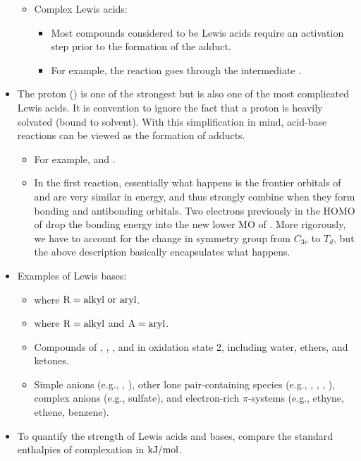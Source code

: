 \documentclass[../notes.tex]{subfiles}
\begin{document}
\begin{itemize}
\begin{itemize}
        \item Complex Lewis acids:
        \begin{itemize}
            \item Most compounds considered to be Lewis acids require an activation step prior to the formation of the adduct.
            \item For example, the reaction  goes through the intermediate .
        \end{itemize}
    \end{itemize}
    \item The proton () is one of the strongest but is also one of the most complicated Lewis acids. It is convention to ignore the fact that a proton is heavily solvated (bound to solvent). With this simplification in mind, acid-base reactions can be viewed as the formation of adducts.
    \begin{itemize}
        \item For example,  and .
        \item In the first reaction, essentially what happens is the frontier orbitals of  and  are very similar in energy, and thus strongly combine when they form bonding and antibonding orbitals. Two electrons previously in the HOMO of  drop the bonding energy into the new lower MO of . More rigorously, we have to account for the change in symmetry group from $C_{3v}$ to $T_d$, but the above description basically encapsulates what happens.
    \end{itemize}
    \item Examples of Lewis bases:
    \begin{itemize}
        \item {} where $\ce{R}=\text{alkyl or aryl}$.
        \item {} where $\ce{R}=\text{alkyl}$ and $\ce{A}=\text{aryl}$.
        \item Compounds of , , , and  in oxidation state 2, including water, ethers, and ketones.
        \item Simple anions (e.g., , ), other lone pair-containing species (e.g., , , , ), complex anions (e.g., sulfate), and electron-rich $\pi$-systems (e.g., ethyne, ethene, benzene).
    \end{itemize}
    \item To quantify the strength of Lewis acids and bases, compare the standard enthalpies of complexation in $\si[per-mode=symbol]{\kilo\joule\per\mole}$.

\end{itemize}
\end{document}
